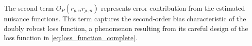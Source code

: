 \documentclass[12pt]{article}
\newcommand{\CP}[1]{{\color{purple}From Chan: #1}}
\begin{document}
The second term $O_P( r_{p,n} r_{\mu,n})$
represents error contribution from the estimated nuisance functions. This term captures the second-order bias characteristic of the doubly robust loss function, a phenomenon resulting from its careful design of the loss function in \eqref{eq:loss_function_complete}. %









    
    
\end{document}
